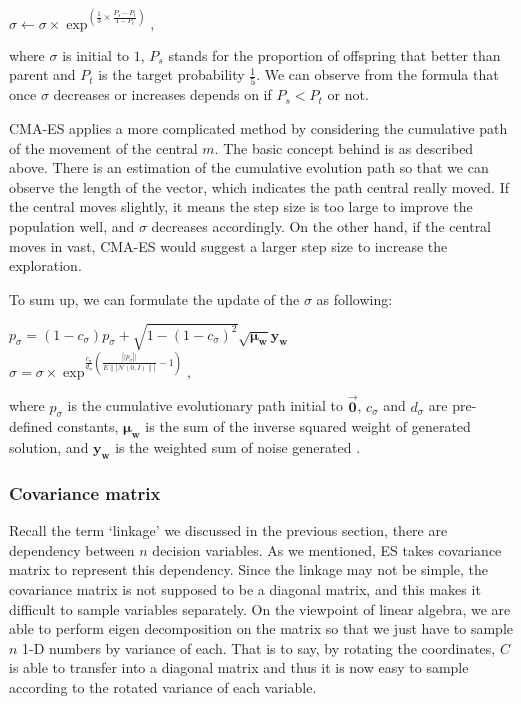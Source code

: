 \begin{center} {$\sigma \leftarrow \sigma \times \exp^{\left(
    \frac{1}{3} \times \frac{P_s-P_t}{1-P_t} \right)},$}\\ \end{center}
  where $\sigma$ is initial to $1$, $P_s$ stands for the proportion of
  offspring that better than parent and $P_t$ is the target probability
  $\frac{1}{5}$.  We can observe from the formula that once $\sigma$
  decreases or increases depends on if $P_s < P_t$ or not.

  CMA-ES applies a more complicated method by considering the cumulative
  path of the movement of the central $m$.  The basic concept behind is
  as described above.  There is an estimation of the cumulative
  evolution path so that we can observe the length of the vector, which
  indicates the path central really moved.  If the central moves
  slightly, it means the step size is too large to improve the
  population well, and $\sigma$ decreases accordingly.  On the other
  hand, if the central moves in vast, CMA-ES would suggest a larger step
  size to increase the exploration.

  To sum up, we can formulate the update of the $\sigma$ as following:\\
  \begin{center} {$p_{\sigma} =
    (1-c_{\sigma})p_{\sigma}+\sqrt{1-{\left(
      1-c_{\sigma}\right)}^2}\sqrt{\mathbf{\mu_w}}\mathbf{y_w}$\\
      $\sigma = \sigma \times \exp^{ \frac{c_{\sigma}}{d_{\sigma}}
      \left(\frac{\left|| p_{\sigma} \right||}{
        E\||{\mathcal{N}(0,I)}\||} -1 \right)  },$\\ } \end{center} where
      $p_{\sigma}$ is the cumulative evolutionary path initial to
      $\vec{\textbf{0}}$, $c_{\sigma}$ and $d_{\sigma}$ are pre-defined
      constants, $\mathbf{\mu_w}$ is the sum of the inverse squared
      weight of generated solution, and $\mathbf{y_w}$ is the weighted
      sum of noise generated .  \subsubsection{Covariance matrix} Recall
      the term `linkage' we discussed in the previous section, there are
      dependency between $n$ decision variables.  As we mentioned, ES
      takes covariance matrix to represent this dependency.  Since the
      linkage may not be simple, the covariance matrix is not supposed
      to be a diagonal matrix, and this makes it difficult to sample
      variables separately.  On the viewpoint of linear algebra, we are
      able to perform eigen decomposition on the matrix so that we just
      have to sample$n$ 1-D numbers by variance of each.  That is to
      say, by rotating the coordinates, $C$ is able to transfer into a
      diagonal matrix and thus it is now easy to sample according to the
      rotated variance of each variable.

